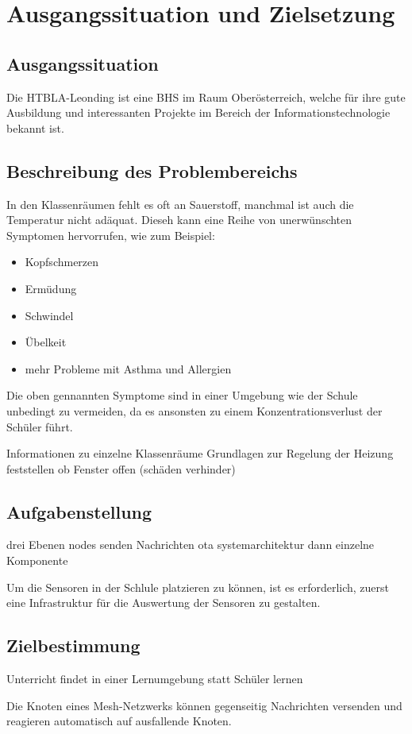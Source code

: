 \chapter{Ausgangssituation und Zielsetzung}

\section{Ausgangssituation}
Die HTBLA-Leonding ist eine BHS im Raum Oberösterreich, welche für ihre gute Ausbildung und interessanten Projekte im Bereich der Informationstechnologie bekannt ist.

\section{Beschreibung des Problembereichs}
In den Klassenräumen fehlt es oft an Sauerstoff, manchmal ist auch die Temperatur nicht adäquat. Dieseh kann eine Reihe von unerwünschten Symptomen hervorrufen, wie zum Beispiel: 

\begin{itemize}
    \item Kopfschmerzen
    \item Ermüdung
    \item Schwindel
    \item Übelkeit
    \item mehr Probleme mit Asthma und Allergien
\end{itemize}

Die oben gennannten Symptome sind in einer Umgebung wie der Schule unbedingt zu vermeiden, da es ansonsten zu einem Konzentrationsverlust der Schüler führt.


Informationen zu einzelne Klassenräume
Grundlagen zur Regelung der Heizung
feststellen ob Fenster offen (schäden verhinder)

\pagebreak
\section{Aufgabenstellung}
drei Ebenen
nodes senden Nachrichten
ota
systemarchitektur
dann einzelne Komponente


Um die Sensoren in der Schlule platzieren zu können, ist es erforderlich, zuerst eine Infrastruktur für die Auswertung der Sensoren zu gestalten.

\section{Zielbestimmung}
Unterricht findet in einer Lernumgebung statt
Schüler lernen

Die Knoten eines Mesh-Netzwerks können gegenseitig Nachrichten versenden und reagieren automatisch auf ausfallende Knoten.